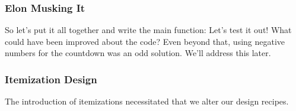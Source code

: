 \documentclass{beamer}
\begin{document}
\begin{frame}
  \frametitle{Elon Musking It}
  So let's put it all together and write the main function:
  \pause
  \main
  \pause
  Let's test it out!
  \pause
  What could have been improved about the code?
  \pause
  Even beyond that, using negative numbers for the countdown
  was an odd solution. We'll address this later.
\end{frame}

\begin{frame}
  \frametitle{Itemization Design}
  The introduction of itemizations necessitated that we alter
  our design recipes.
\end{frame}
\end{document}
